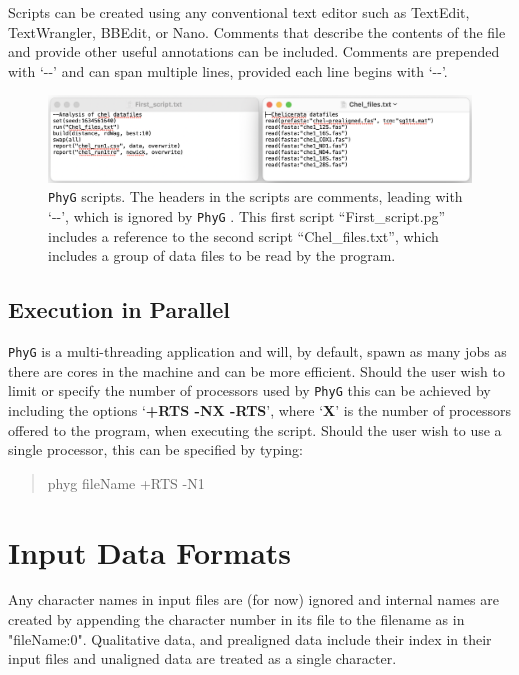 \documentclass[11pt]{book}
\newcommand{\phyg}{\texttt{PhyG} }
\begin{document}
{{		Scripts can be created using any conventional text editor such as TextEdit, TextWrangler, 
		BBEdit, or Nano. Comments that describe the contents of the file and provide other useful 
		annotations can be included. Comments are prepended with `-{}-' and can span multiple 
		lines, provided each line begins with `-{}-'. 

		\begin{figure}[H]
		\centering
		\includegraphics[width=\textwidth]{First_run.jpg}
		\caption{\phyg scripts. The headers in the scripts are comments, leading with `-{}-', which is 
		ignored by \phyg. This first script ``First\_script.pg'' includes a reference to the second script
		``Chel\_files.txt'', which includes a group of data files to be read by the program.}
		\label{firstscript}
		\end{figure}

	
	\subsection{Execution in Parallel}
		\label{subsec:parallel}
		\phyg is a multi-threading application and will, by default, spawn as many jobs as there 
		are cores in the machine and can be more efficient. Should the user wish to limit or 
		specify the number of processors used by \phyg this can be achieved by including the 
		options `\textbf{+RTS -NX -RTS}', where `\textbf{X}' is the number of processors offered 
		to the program, when executing the script. Should the user wish to use a single processor, 
		this can be specified by typing:

		\begin{quote}
		phyg fileName +RTS -N1 
		\end{quote}		

		
	\section{Input Data Formats} 
	Any character names in input files are (for now) ignored and internal names are created
	by appending the character number in its file to the filename as in "fileName:0".
	Qualitative data, and prealigned data include their index in their input files and unaligned 
	data are treated as a single character.
		
}}
\end{document}
